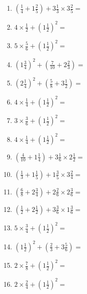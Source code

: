 \documentclass[12pt]{article}
\begin{document}
\begin{enumerate}
\newpage
\item \large $ (\frac{1}{4} + 1 \frac{2}{5}) + 3 \frac{1}{3} \times 3 \frac{2}{5} = $ \vspace{1.8cm}
\item \large $ 4 \times \frac{1}{2} + (1 \frac{1}{2})^2 = $ \vspace{1.8cm}
\item \large $ 5 \times \frac{5}{6} + (1 \frac{1}{2})^2 = $ \vspace{1.8cm}
\item \large $ (1 \frac{3}{4})^2 + (\frac{7}{10} + 2 \frac{2}{3}) = $ \vspace{1.8cm}
\item \large $ (2 \frac{1}{4})^2 + (\frac{5}{8} + 3 \frac{1}{2}) = $ \vspace{1.8cm}
\item \large $ 4 \times \frac{1}{4} + (1 \frac{1}{2})^2 = $ \vspace{1.8cm}
\item \large $ 3 \times \frac{3}{6} + (1 \frac{1}{2})^2 = $ \vspace{1.8cm}
\item \large $ 4 \times \frac{1}{4} + (1 \frac{1}{2})^2 = $ \vspace{1.8cm}
\item \large $ (\frac{4}{10} + 1 \frac{1}{4}) + 3 \frac{1}{6} \times 2 \frac{1}{2} = $ \vspace{1.8cm}
\item \large $ (\frac{1}{3} + 1 \frac{1}{5}) + 1 \frac{3}{5} \times 3 \frac{2}{4} = $ \vspace{1.8cm}
\newpage
\item \large $ (\frac{6}{8} + 2 \frac{3}{4}) + 2 \frac{2}{6} \times 2 \frac{3}{6} = $ \vspace{1.8cm}
\item \large $ (\frac{1}{2} + 2 \frac{1}{2}) + 3 \frac{3}{6} \times 1 \frac{3}{6} = $ \vspace{1.8cm}
\item \large $ 5 \times \frac{3}{4} + (1 \frac{1}{2})^2 = $ \vspace{1.8cm}
\item \large $ (1 \frac{1}{2})^2 + (\frac{2}{3} + 3 \frac{5}{6}) = $ \vspace{1.8cm}
\item \large $ 2 \times \frac{7}{8} + (1 \frac{1}{2})^2 = $ \vspace{1.8cm}
\item \large $ 2 \times \frac{2}{4} + (1 \frac{1}{2})^2 = $ \vspace{1.8cm}

\end{enumerate}
\end{document}
